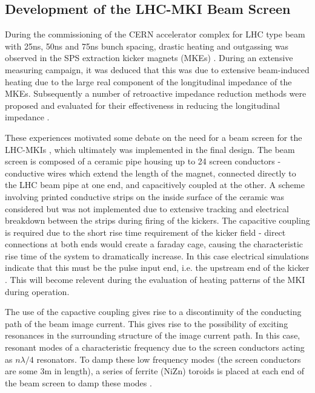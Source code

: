 \subsection{Development of the LHC-MKI Beam Screen}
\label{sec:mki-screen-development}

During the commissioning of the CERN accelerator complex for LHC type beam with 25ns, 50ns and 75ns bunch spacing, drastic heating and outgassing was observed in the SPS extraction kicker magnets (MKEs) \cite{Barnes:spsKickerHeating}. During an extensive measuring campaign, it was deduced that this was due to extensive beam-induced heating due to the large real component of the longitudinal impedance of the MKEs. Subsequently a number of retroactive impedance reduction methods were proposed and evaluated for their effectiveness in reducing the longitudinal impedance \cite{Kroyer:MKEReduct}.

These experiences motivated some debate on the need for a beam screen for the LHC-MKIs \cite{Vos:beamScreen, Barnes:improvBeamScreen}, which ultimately was implemented in the final design. The beam screen is composed of a ceramic pipe housing up to 24 screen conductors - conductive wires which extend the length of the magnet, connected directly to the LHC beam pipe at one end, and capacitively coupled at the other. A scheme involving printed conductive strips on the inside surface of the ceramic was considered but was not implemented due to extensive tracking and electrical breakdown between the strips during firing of the kickers. The capacitive coupling is required due to the short rise time requirement of the kicker field - direct connections at both ends would create a faraday cage, causing the characteristic rise time of the system to dramatically increase. In this case electrical simulations indicate that this must be the pulse input end, i.e. the upstream end of the kicker \cite{Barnes:improvBeamScreen}. This will become relevent during the evaluation of heating patterns of the MKI during operation.

The use of the capactive coupling gives rise to a discontinuity of the conducting path of the beam image current. This gives rise to the possibility of exciting resonances in the surrounding structure of the image current path. In this case, resonant modes of a characteristic frequency due to the screen conductors acting as $n \lambda /4$ resonators. To damp these low frequency modes (the screen conductors are some 3m in length), a series of ferrite (NiZn) toroids is placed at each end of the beam screen to damp these modes \cite{Caspers:impMeasMKI, Caspera:impMeasLowFreqMKI, Caspers:lowFreqMKIMeas}. 

